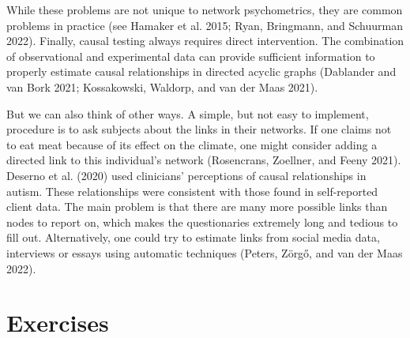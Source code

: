 \documentclass[
  letterpaper,
]{scrbook}
\begin{document}
While these problems are not unique to network psychometrics, they are
common problems in practice (see Hamaker et al. 2015; Ryan, Bringmann,
and Schuurman 2022). Finally, causal testing always requires direct
intervention. The combination of observational and experimental data can
provide sufficient information to properly estimate causal relationships
in directed acyclic graphs (Dablander and van Bork 2021; Kossakowski,
Waldorp, and van der Maas 2021).

But we can also think of other ways. A simple, but not easy to
implement, procedure is to ask subjects about the links in their
networks. If one claims not to eat meat because of its effect on the
climate, one might consider adding a directed link to this individual's
network (Rosencrans, Zoellner, and Feeny 2021). Deserno et al. (2020)
used clinicians' perceptions of causal relationships in autism. These
relationships were consistent with those found in self-reported client
data. The main problem is that there are many more possible links than
nodes to report on, which makes the questionaries extremely long and
tedious to fill out. Alternatively, one could try to estimate links from
social media data, interviews or essays using automatic techniques
(Peters, Zörgő, and van der Maas 2022).

\hypertarget{exercises-5}{%
\section{Exercises}\label{exercises-5}}
\end{document}
